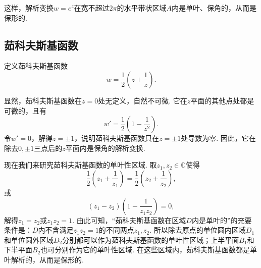 这样，解析变换\(w = e^z\)在宽不超过\(2\pi\)的水平带状区域\(A\)内是单叶、保角的，从而是保形的.

\subsection{茹科夫斯基函数}
\begin{definition}
定义茹科夫斯基函数\[
w = \frac{1}{2} \left(z + \frac{1}{z}\right).
\]
\end{definition}

显然，茹科夫斯基函数在\(z=0\)处无定义，自然不可微.
它在\(z\)平面的其他点处都是可微的，且有\[
w' = \frac{1}{2} \left(1 - \frac{1}{z^2}\right).
\]令\(w' = 0\)，解得\(z=\pm1\)，说明茹科夫斯基函数只在\(z=\pm1\)处导数为零.
因此，它在除去\(0,\pm1\)三点后的\(z\)平面内是保角的解析变换.

现在我们来研究茹科夫斯基函数的单叶性区域.
取\(z_1,z_2\in\mathbb{C}\)使得\[
\frac{1}{2} \left(z_1 + \frac{1}{z_1}\right)
= \frac{1}{2} \left(z_2 + \frac{1}{z_2}\right),
\]或\[
(z_1-z_2)\left(1-\frac{1}{z_1 z_2}\right) = 0,
\]解得\(z_1 = z_2\)或\(z_1 z_2 = 1\).
由此可知，“茹科夫斯基函数在区域\(D\)内是单叶的”的充要条件是：\(D\)内不含满足\(z_1 z_2 = 1\)的不同两点\(z_1,z_2\).
所以除去原点的单位圆内区域\(D_1\)和单位圆外区域\(D_2\)分别都可以作为茹科夫斯基函数的单叶性区域；上半平面\(B_1\)和下半平面\(B_2\)也可分别作为它的单叶性区域.
在这些区域内，茹科夫斯基函数都是单叶解析的，从而是保形的.

